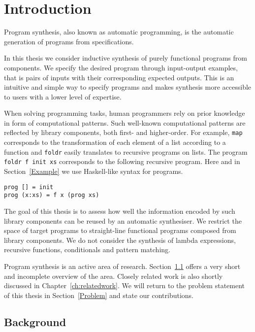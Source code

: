 \lstset{style=plain}

\chapter{Introduction}\label{ch:introduction}

Program synthesis, also known as automatic programming, is the automatic generation of programs from specifications.

In this thesis we consider inductive synthesis of purely functional programs from components. We specify the desired program through input-output examples, that is pairs of inputs with their corresponding expected outputs. This is an intuitive and simple way to specify programs and makes synthesis more accessible to users with a lower level of expertise.

When solving programming tasks, human programmers rely on prior knowledge in form of computational patterns. Such well-known computational patterns are reflected by library components, both first- and higher-order. For example, \lstinline!map! corresponds to the transformation of each element of a list according to a function and \lstinline!foldr! easily translates to recursive programs on lists. The program \lstinline!foldr f init xs! corresponds to the following recursive program. Here and in Section~\ref{Example} we use Haskell-like syntax for programs.
\begin{lstlisting}[style=plain]
prog [] = init
prog (x:xs) = f x (prog xs)
\end{lstlisting}
The goal of this thesis is to assess how well the information encoded by such library components can be reused by an automatic synthesiser.
We restrict the space of target programs to straight-line functional programs composed from library components. We do not consider the synthesis of lambda expressions, recursive functions, conditionals and pattern matching.

Program synthesis is an active area of research. Section~\ref{Background} offers a very short and incomplete overview of the area. Closely related work is also shortly discussed in Chapter~\ref{ch:relatedwork}.
We will return to the problem statement of this thesis in Section~\ref{Problem} and state our contributions.

\section{Background}\label{Background}

